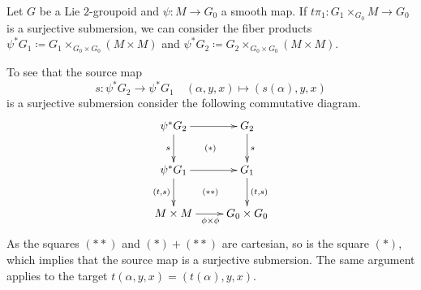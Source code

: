 %
%


Let $G$ be a Lie $2$-groupoid and $\psi: M\to G_0$  a smooth map.
If $t\pi_1: G_1\times_{G_0} M \to G_0$ is a surjective submersion, we can consider the fiber products $\psi^*G_1 \coloneqq G_1\times_{G_0\times G_0}(M\times M)$ and $\psi^*G_2 \coloneqq G_2\times_{G_0\times G_0}(M\times M)$.


To see that the source map
$$ s: \psi^*G_2\to \psi^*G_1 \quad (\alpha,y,x) \mapsto (s(\alpha),y,x) $$
is a surjective submersion consider the following commutative diagram.
\begin{equation}
\begin{gathered}
\xymatrix{
  \psi^*G_2 \ar[r] \ar[d]_{s} \ar@{}[dr] | {(*)} & G_2 \ar[d]^{s} \\
  \psi^*G_1 \ar[r] \ar[d]_{(t,s)} \ar@{}[dr] | {(**)} & G_1 \ar[d]^{(t,s)} \\
  M\times M \ar[r]_{\phi\times\phi} & G_0\times G_0
}
\end{gathered}
\end{equation}
As the squares $(**)$ and $(*)+(**)$ are cartesian, so is the square $(*)$, which implies that the source map is a surjective submersion.
The same argument applies to the target $t(\alpha,y,x)=(t(\alpha),y,x)$.

